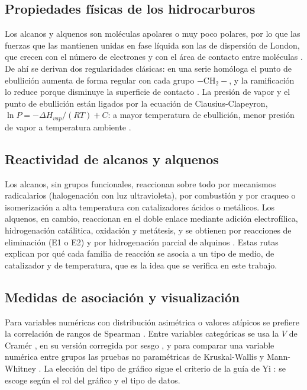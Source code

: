 \documentclass[twoside,twocolumn,10pt]{article}
\begin{document}
\subsection{Propiedades f\'isicas de los hidrocarburos}
Los alcanos y alquenos son moléculas apolares o muy poco polares, por lo que las fuerzas que las mantienen unidas en fase l\'iquida son las de dispersi\'on de London, que crecen con el n\'umero de electrones y con el \'area de contacto entre moléculas \cite{Clayden2012}. De ah\'i se derivan dos regularidades cl\'asicas: en una serie hom\'ologa el punto de ebullici\'on aumenta de forma regular con cada grupo $-\mathrm{CH_2}-$, y la ramificaci\'on lo reduce porque disminuye la superficie de contacto \cite{McMurry2016}. La presi\'on de vapor y el punto de ebullici\'on est\'an ligados por la ecuaci\'on de Clausius-Clapeyron, $\ln P=-\Delta H_{vap}/(RT)+C$: a mayor temperatura de ebullici\'on, menor presi\'on de vapor a temperatura ambiente \cite{Atkins2014}.

\subsection{Reactividad de alcanos y alquenos}
Los alcanos, sin grupos funcionales, reaccionan sobre todo por mecanismos radicalarios (halogenaci\'on con luz ultravioleta), por combusti\'on y por craqueo o isomerizaci\'on a alta temperatura con catalizadores \'acidos o met\'alicos. Los alquenos, en cambio, reaccionan en el doble enlace mediante adici\'on electrof\'ilica, hidrogenaci\'on cat\'alitica, oxidaci\'on y metátesis, y se obtienen por reacciones de eliminaci\'on (E1 o E2) y por hidrogenaci\'on parcial de alquinos \cite{Clayden2012,McMurry2016}. Estas rutas explican por qu\'e cada familia de reacci\'on se asocia a un tipo de medio, de catalizador y de temperatura, que es la idea que se verifica en este trabajo.

\subsection{Medidas de asociaci\'on y visualizaci\'on}
Para variables num\'ericas con distribuci\'on asim\'etrica o valores at\'ipicos se prefiere la correlaci\'on de rangos de Spearman \cite{Spearman1904}. Entre variables categ\'oricas se usa la $V$ de Cram\'er \cite{Cramer1946}, en su versi\'on corregida por sesgo \cite{Bergsma2013}, y para comparar una variable num\'erica entre grupos las pruebas no param\'etricas de Kruskal-Wallis \cite{Kruskal1952} y Mann-Whitney \cite{Mann1947}. La elecci\'on del tipo de gr\'afico sigue el criterio de la gu\'ia de Yi \cite{Yi2019}: se escoge seg\'un el rol del gr\'afico y el tipo de datos.
\end{document}
